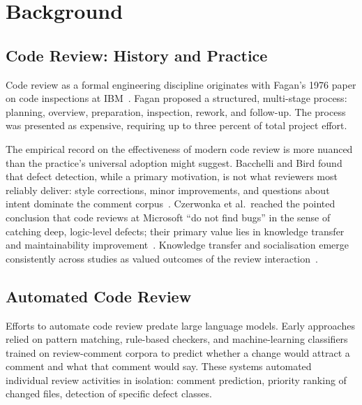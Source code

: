 \documentclass[10pt,conference]{IEEEtran}
\begin{document}
\section{Background}
\label{sec:background}

\subsection{Code Review: History and Practice}

Code review as a formal engineering discipline originates with Fagan's 1976 paper on code inspections at IBM~\cite{fagan1976design}.
Fagan proposed a structured, multi-stage process: planning, overview, preparation, inspection, rework, and follow-up.
The process was presented as expensive, requiring up to three percent of total project effort.

The empirical record on the effectiveness of modern code review is more nuanced than the practice's universal adoption might suggest.
Bacchelli and Bird found that defect detection, while a primary motivation, is not what reviewers most reliably deliver: style corrections, minor improvements, and questions about intent dominate the comment corpus~\cite{bacchelli2013expectations}.
Czerwonka et al.\ reached the pointed conclusion that code reviews at Microsoft ``do not find bugs'' in the sense of catching deep, logic-level defects; their primary value lies in knowledge transfer and maintainability improvement~\cite{czerwonka2015code}.
Knowledge transfer and socialisation emerge consistently across studies as valued outcomes of the review interaction~\cite{bacchelli2013expectations,bosu2016process}.



\subsection{Automated Code Review}

Efforts to automate code review predate large language models.
Early approaches relied on pattern matching, rule-based checkers, and machine-learning classifiers trained on review-comment corpora to predict whether a change would attract a comment and what that comment would say.
These systems automated individual review activities in isolation: comment prediction, priority ranking of changed files, detection of specific defect classes.
\end{document}
